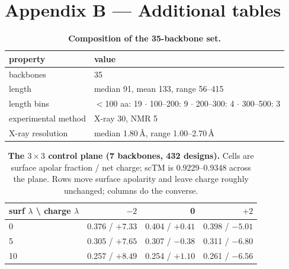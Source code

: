 \section*{Appendix B --- Additional tables}
\label{app:additional-tables}

\renewcommand{\thetable}{B.\arabic{table}}
\setcounter{table}{0}

\begin{table}[H]
  \centering
  \small
  \caption{\textbf{Composition of the 35-backbone set.}}
  \label{tab:backbones}
  \begin{tabular}{@{}ll@{}}
    \toprule
    property & value \\
    \midrule
    backbones & 35 \\
    length & median 91, mean 133, range 56--415 \\
    length bins & $<$100 aa: 19 $\cdot$ 100--200: 9 $\cdot$ 200--300: 4 $\cdot$ 300--500: 3 \\
    experimental method & X-ray 30, NMR 5 \\
    X-ray resolution & median 1.80\,\AA, range 1.00--2.70\,\AA \\
    \bottomrule
  \end{tabular}
\end{table}

\begin{table}[H]
  \centering
  \small
  \caption{\textbf{The $3\times3$ control plane (7 backbones, 432 designs).}
  Cells are surface apolar fraction / net charge; scTM is 0.9229--0.9348 across
  the plane. Rows move surface apolarity and leave charge roughly unchanged;
  columns do the converse.}
  \label{tab:control-plane}
  \begin{tabular}{@{}lrrr@{}}
    \toprule
    surf $\lambda$ \textbackslash{} charge $\lambda$ & $-2$ & 0 & $+2$ \\
    \midrule
    0 & 0.376 / $+7.33$ & 0.404 / $+0.41$ & 0.398 / $-5.01$ \\
    5 & 0.305 / $+7.65$ & 0.307 / $-0.38$ & 0.311 / $-6.80$ \\
    10 & 0.257 / $+8.49$ & 0.254 / $+1.10$ & 0.261 / $-6.56$ \\
    \bottomrule
  \end{tabular}
\end{table}

